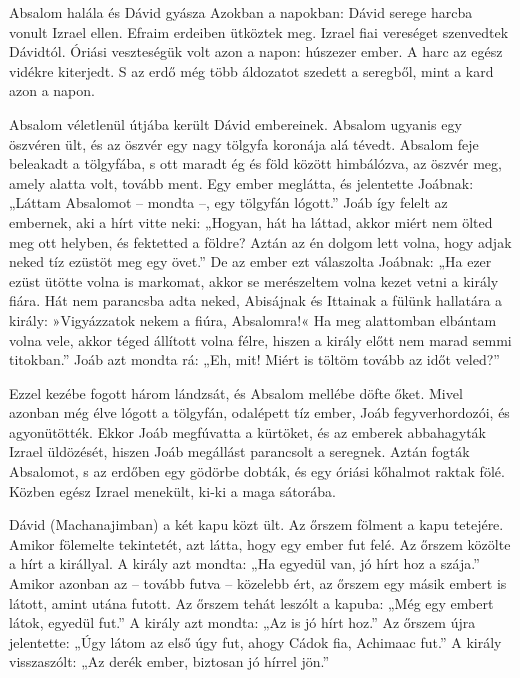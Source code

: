 \documentclass[twoside]{article}
\begin{document}
\begin{lectio}{Absalom halála és Dávid gyásza}
\noindent Azokban a napokban: Dávid serege harcba vonult Izrael ellen. Efraim erdeiben ütköztek meg. Izrael fiai vereséget szenvedtek Dávidtól. Óriási veszteségük volt azon a napon: húszezer ember. A harc az egész vidékre kiterjedt. S az erdő még több áldozatot szedett a seregből, mint a kard azon a napon.

Absalom véletlenül útjába került Dávid embereinek. Absalom ugyanis egy öszvéren ült, és az öszvér egy nagy tölgyfa koronája alá tévedt. Absalom feje beleakadt a tölgyfába, s ott maradt ég és föld között himbálózva, az öszvér meg, amely alatta volt, tovább ment. Egy ember meglátta, és jelentette Joábnak: „Láttam Absalomot – mondta –, egy tölgyfán lógott.” Joáb így felelt az embernek, aki a hírt vitte neki: „Hogyan, hát ha láttad, akkor miért nem ölted meg ott helyben, és fektetted a földre? Aztán az én dolgom lett volna, hogy adjak neked tíz ezüstöt meg egy övet.” De az ember ezt válaszolta Joábnak: „Ha ezer ezüst ütötte volna is markomat, akkor se merészeltem volna kezet vetni a király fiára. Hát nem parancsba adta neked, Abisájnak és Ittainak a fülünk hallatára a király: »Vigyázzatok nekem a fiúra, Absalomra!« Ha meg alattomban elbántam volna vele, akkor téged állított volna félre, hiszen a király előtt nem marad semmi titokban.” Joáb azt mondta rá: „Eh, mit! Miért is töltöm tovább az időt veled?”

Ezzel kezébe fogott három lándzsát, és Absalom mellébe döfte őket. Mivel azonban még élve lógott a tölgyfán, odalépett tíz ember, Joáb fegyverhordozói, és agyonütötték. Ekkor Joáb megfúvatta a kürtöket, és az emberek abbahagyták Izrael üldözését, hiszen Joáb megállást parancsolt a seregnek. Aztán fogták Absalomot, s az erdőben egy gödörbe dobták, és egy óriási kőhalmot raktak fölé. Közben egész Izrael menekült, ki-ki a maga sátorába.

Dávid (Machanajimban) a két kapu közt ült. Az őrszem fölment a kapu tetejére. Amikor fölemelte tekintetét, azt látta, hogy egy ember fut felé. Az őrszem közölte a hírt a királlyal. A király azt mondta: „Ha egyedül van, jó hírt hoz a szája.” Amikor azonban az – tovább futva – közelebb ért, az őrszem egy másik embert is látott, amint utána futott. Az őrszem tehát leszólt a kapuba: „Még egy embert látok, egyedül fut.” A király azt mondta: „Az is jó hírt hoz.” Az őrszem újra jelentette: „Úgy látom az első úgy fut, ahogy Cádok fia, Achimaac fut.” A király visszaszólt: „Az derék ember, biztosan jó hírrel jön.”


\end{lectio}
\end{document}
